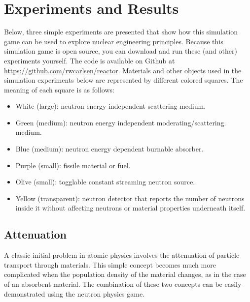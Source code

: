 \documentclass{anstrans}
\begin{document}
\section{Experiments and Results}

Below, three simple experiments are presented that show how this simulation
game can be used to explore nuclear engineering principles.  Because this
simulation game is open source, you can download and run these (and other)
experiments yourself.  The code is available on Github at
\url{https://github.com/rwcarlsen/reactor}.  Materials and other objects used
in the simulation experiments below are represented by different colored
squares.  The meaning of each square is as follows:

\begin{itemize}
        
    \item White (large): neutron energy independent scattering medium.

    \item Green (medium): neutron energy independent moderating/scattering.
        medium.

    \item Blue (medium): neutron energy dependent burnable absorber.

    \item Purple (small): fissile material or fuel.

    \item Olive (small): togglable constant streaming neutron source.

    \item Yellow (transparent): neutron detector that reports the number of
        neutrons inside it without affecting neutrons or material properties
        underneath itself.

\end{itemize}


\subsection{Attenuation}

A classic initial problem in atomic physics involves the attenuation of particle
transport through materials. This simple concept becomes much more complicated
when the population density of the material changes, as in the case of an
absorbent material. The combination of these two concepts can be easily
demonstrated using the neutron physics game.
\end{document}
